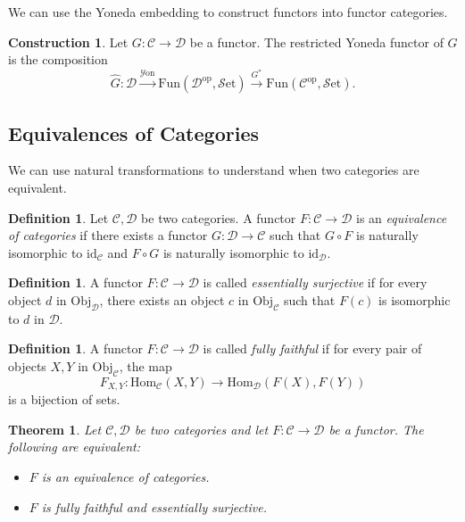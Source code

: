 \documentclass[11pt, a4paper]{amsart}
\newcommand{\cC}{\mathcal{C}}
\newcommand{\cD}{\mathcal{D}}
\newcommand{\Hom}{\mathrm{Hom}}
\newcommand{\op}{\mathrm{op}}
\newcommand{\Fun}{\mathrm{Fun}}
\newcommand{\Set}{\mathscr{S}\mathrm{et}}
\newcommand{\Yon}{\mathscr{Y}\mathrm{on}}
\newcommand{\id}{\mathrm{id}}
\newcommand{\Obj}{\mathrm{Obj}}
\newtheorem{theorem}[equation]{Theorem}
\theoremstyle{definition}
\newtheorem{definition}[equation]{Definition}
\newtheorem{construction}[equation]{Construction}
\theoremstyle{remark}
\numberwithin{equation}{section}
\begin{document}
We can use the Yoneda embedding to construct functors into functor categories. 

\begin{construction} \label{constr:restricted yoneda}
 Let $G\colon \cC \to \cD$ be a functor. The restricted Yoneda functor of $G$ is the composition
 \[\hat{G}\colon \cD \xrightarrow{\Yon} \Fun(\cD^{\op},\Set) \xrightarrow{G^*} \Fun(\cC^{\op},\Set).\]
\end{construction}

\subsection{Equivalences of Categories}
We can use natural transformations to understand when two categories are equivalent.

\begin{definition} \label{def:equivalence of categories}
	Let $\cC,\cD$ be two categories. A functor $F\colon \cC \to \cD$ is an \emph{equivalence of categories} if there exists a functor $G\colon \cD \to \cC$ such that $G \circ F$ is naturally isomorphic to $\id_{\cC}$ and $F \circ G$ is naturally isomorphic to $\id_{\cD}$.
\end{definition}

\begin{definition} \label{def:essentially surjective}
  A functor $F\colon \cC \to \cD$ is called \emph{essentially surjective} if for every object $d$ in $\Obj_{\cD}$, there exists an object $c$ in $\Obj_{\cC}$ such that $F(c)$ is isomorphic to $d$ in $\cD$.
\end{definition}

\begin{definition} \label{def:fully faithful}
  A functor $F\colon \cC \to \cD$ is called \emph{fully faithful} if for every pair of objects $X,Y$ in $\Obj_{\cC}$, the map 
  \[
  F_{X,Y}\colon \Hom_{\cC}(X,Y) \to \Hom_{\cD}(F(X),F(Y))
  \]
  is a bijection of sets.
\end{definition}

\begin{theorem} \label{thm:equivalence of categories}
	Let $\cC,\cD$ be two categories and let $F\colon \cC \to \cD$ be a functor. The following are equivalent:
	\begin{itemize}
		\item $F$ is an equivalence of categories.
		\item $F$ is fully faithful and essentially surjective. 
	\end{itemize}
\end{theorem}
\end{document}

